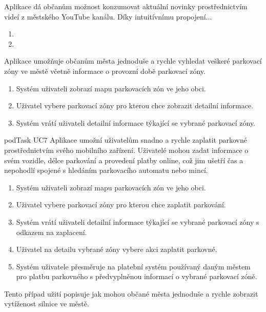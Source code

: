 Aplikace dá občanům možnost konzumovat aktuální novinky prostřednictvím videí z městského YouTube kanálu. Díky intuitívnímu propojení...

\begin{enumerate}
  \item 
  \item 
\end{enumerate}

Aplikace umožňuje občanům města jednoduše a rychle vyhledat veškeré parkovací zóny ve městě včetně informace o provozní době parkovací zóny.

\begin{enumerate}
  \item Systém uživateli zobrazí mapu parkovacích zón ve jeho obci.
  \item Uživatel vybere parkovací zóny pro kterou chce zobrazit detailní informace.
  \item Systém vrátí uživateli detailní informace týkající se vybrané parkovací zóny.
\end{enumerate}

  podTask UC7
Aplikace umožní uživatelům snadno a rychle zaplatit parkovné prostřednictvím svého mobilního zařízení. Uživatelé mohou zadat informace o svém vozidle, 
délce parkování a provedení platby online, což jim ušetří čas a nepohodlí spojené s hledáním parkovacího automatu nebo mincí.

\begin{enumerate}
  \item Systém uživateli zobrazí mapu parkovacích zón ve jeho obci.
  \item Uživatel vybere parkovací zóny pro kterou chce zaplatit parkování.
  \item Systém vrátí uživateli detailní informace týkající se vybrané parkovací zóny s odkazem na zaplacení.
  \item Uživatel na detailu vybrané zóny vybere akci zaplatit parkovné.
  \item Systém uživatele přesměruje na platební systém používaný daným městem pro platbu parkovného s předvyplněnou informací o vybrané parkovací zóně.
\end{enumerate}

Tento případ užití popisuje jak mohou občané města jednoduše a rychle zobrazit vytíženost silnice ve městě.

